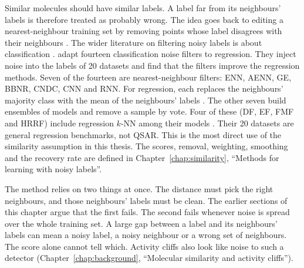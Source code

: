 Similar molecules should have similar labels. A label far from its neighbours' labels is therefore treated as probably wrong. The idea goes back to editing a nearest-neighbour training set by removing points whose label disagrees with their neighbours \citep{Wilson1972}. The wider literature on filtering noisy labels is about classification \citep{Brodley1999, frenay2014classification}. \citet{Martin2021} adapt fourteen classification noise filters to regression. They inject noise into the labels of 20 datasets and find that the filters improve the regression methods. Seven of the fourteen are nearest-neighbour filters: ENN, AENN, GE, BBNR, CNDC, CNN and RNN. For regression, each replaces the neighbours' majority class with the mean of the neighbours' labels \citep{Martin2021}. The other seven build ensembles of models and remove a sample by vote. Four of these (DF, EF, FMF and HRRF) include regression $k$-NN among their models \citep{Martin2021}. Their 20 datasets are general regression benchmarks, not QSAR.
This is the most direct use of the similarity assumption in this thesis. The scores, removal, weighting, smoothing and the recovery rate are defined in Chapter~\ref{chap:similarity}, ``Methods for learning with noisy labels''.

The method relies on two things at once. The distance must pick the right neighbours, and those neighbours' labels must be clean. The earlier sections of this chapter argue that the first fails. The second fails whenever noise is spread over the whole training set. A large gap between a label and its neighbours' labels can mean a noisy label, a noisy neighbour or a wrong set of neighbours. The score alone cannot tell which. Activity cliffs also look like noise to such a detector (Chapter~\ref{chap:background}, ``Molecular similarity and activity cliffs'').

